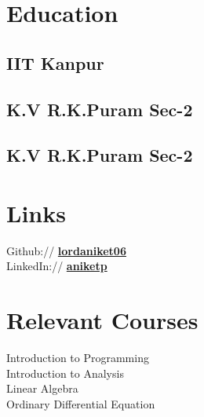 \documentclass[]{deedy-resume-openfont}
\begin{document}
\begin{minipage}[t]{0.33\textwidth} 


\section{Education} 

\subsection{IIT Kanpur}
\sectionsep{}

\subsection{K.V R.K.Puram Sec-2}
\sectionsep{}

\subsection{K.V R.K.Puram Sec-2}


\section{Links} 
Github:// \href{https://github.com/lordaniket06}{\bf lordaniket06} \\
LinkedIn://  \href{https://www.linkedin.com/in/aniket-pandey-001a0613b}{\bf aniketp} \\



\section{Relevant Courses}
Introduction to Programming \\
Introduction to Analysis \\
Linear Algebra \\
Ordinary Differential Equation \\ %


\end{minipage}
\end{document}
